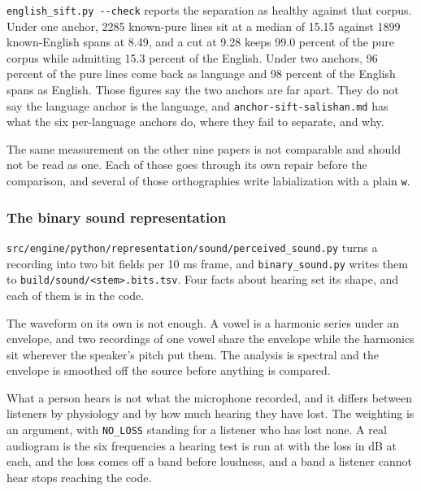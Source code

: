 \texttt{english\_\allowbreak{}sift.\allowbreak{}py -\allowbreak{}-\allowbreak{}check} reports the separation as healthy against that corpus. Under one anchor, 2285 known-pure lines sit at a median of 15.15 against 1899 known-English spans at 8.49, and a cut at 9.28 keeps 99.0 percent of the pure corpus while admitting 15.3 percent of the English. Under two anchors, 96 percent of the pure lines come back as language and 98 percent of the English spans as English. Those figures say the two anchors are far apart. They do not say the language anchor is the language, and \texttt{anchor-\allowbreak{}sift-\allowbreak{}salishan.\allowbreak{}md} has what the six per-language anchors do, where they fail to separate, and why.

The same measurement on the other nine papers is not comparable and should not be read as one. Each of those goes through its own repair before the comparison, and several of those orthographies write labialization with a plain \texttt{w}.

\subsubsection{The binary sound representation}

\texttt{src/\allowbreak{}engine/\allowbreak{}python/\allowbreak{}representation/\allowbreak{}sound/\allowbreak{}perceived\_\allowbreak{}sound.\allowbreak{}py} turns a recording into two bit fields per 10 ms frame, and \texttt{binary\_\allowbreak{}sound.\allowbreak{}py} writes them to \texttt{build/\allowbreak{}sound/\allowbreak{}<stem>.\allowbreak{}bits.\allowbreak{}tsv}. Four facts about hearing set its shape, and each of them is in the code.

The waveform on its own is not enough. A vowel is a harmonic series under an envelope, and two recordings of one vowel share the envelope while the harmonics sit wherever the speaker's pitch put them. The analysis is spectral and the envelope is smoothed off the source before anything is compared.

What a person hears is not what the microphone recorded, and it differs between listeners by physiology and by how much hearing they have lost. The weighting is an argument, with \texttt{NO\_\allowbreak{}LOSS} standing for a listener who has lost none. A real audiogram is the six frequencies a hearing test is run at with the loss in dB at each, and the loss comes off a band before loudness, and a band a listener cannot hear stops reaching the code.

